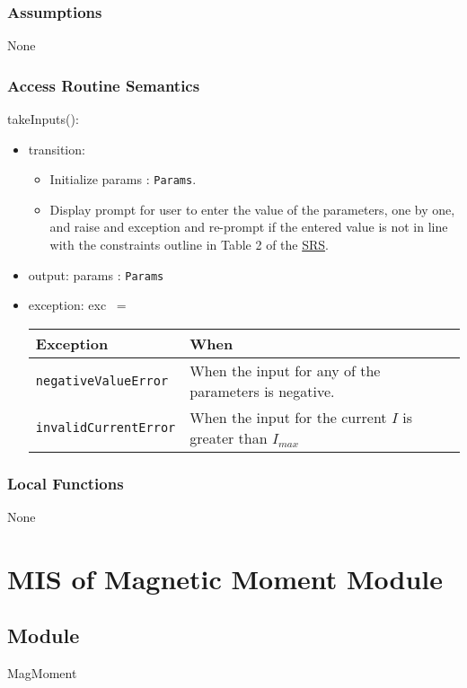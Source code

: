 \documentclass[12pt, titlepage]{article}
\begin{document}
\subsubsection{Assumptions}
None 

\subsubsection{Access Routine Semantics}

\noindent takeInputs():
\begin{itemize}
\item transition: 
\begin{itemize}
  \item Initialize params : \texttt{Params}. 
  \item Display prompt for user to enter the value of the parameters, one by one, and raise and exception and re-prompt if the entered value is not in line with the constraints outline in Table 2 of the \href{https://github.com/husseinsd1/optimal-em-arrangement/blob/main/docs/SRS/SRS.pdf}{SRS}. 
\end{itemize} 
\item output: params : \texttt{Params} 
\item exception: exc $\:=$
\begin{center}
  \begin{tabular}{p{5cm} p{4cm}}
  \hline
  \textbf{Exception} & \textbf{When} \\
  \hline
  \texttt{negativeValueError} & When the input for any of the parameters is negative.  \\
  \hline
  \texttt{invalidCurrentError} & When the input for the current $I$ is greater than $I_{max}$  \\
  \hline
  \end{tabular}
  \end{center}
\end{itemize}

\subsubsection{Local Functions}
None

\newpage


\section{MIS of Magnetic Moment Module} \label{MISMagMoment}
\subsection{Module}
MagMoment
\end{document}
